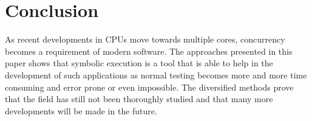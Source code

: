 \documentclass[10pt]{llncs}
\begin{document}
\section{Conclusion}

As recent developments in CPUs move towards multiple cores, concurrency becomes a requirement of modern software. The approaches presented in this paper shows that symbolic execution is a tool that is able to help in the development of such applications as normal testing becomes more and more time consuming and error prone or even impossible. The diversified methods prove that the field has still not been thoroughly studied and that many more developments will be made in the future.



\end{document}
